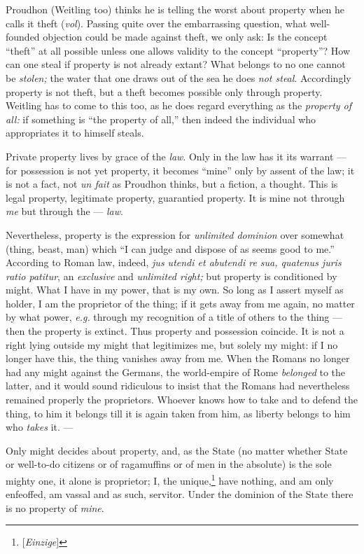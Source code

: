 \myhrule


Proudhon (Weitling too) thinks he is telling the worst about property when he 
calls it theft (\textit{vol}). Passing quite over the embarrassing question, 
what well-founded objection could be made against theft, we only ask: Is the 
concept ``theft'' at all possible unless one allows validity to the concept 
``property''? How can one steal if property is not already extant? What 
belongs to no one cannot be \textit{stolen;} the water that one draws out of 
the sea he does \textit{not steal}. Accordingly property is not theft, but a 
theft becomes possible only through property. Weitling has to come to this 
too, as he does regard everything as the \textit{property of all:} if 
something is ``the property of all,'' then indeed the individual who 
appropriates it to himself steals.

Private property lives by grace of the \textit{law}. Only in the law has it 
its warrant --- for possession is not yet property, it becomes ``mine'' only 
by assent of the law; it is not a fact, not \textit{un fait} as Proudhon 
thinks, but a fiction, a thought. This is legal property, legitimate property, 
guarantied property. It is mine not through \textit{me} but through the --- \textit{law}.

Nevertheless, property is the expression for \textit{unlimited dominion} over 
somewhat (thing, beast, man) which ``I can judge and dispose of as seems good 
to me.'' According to Roman law, indeed, \textit{jus utendi et abutendi re 
sua, quatenus juris ratio patitur}, an \textit{exclusive} and 
\textit{unlimited right;} but property is conditioned by might. What I have in 
my power, that is my own. So long as I assert myself as holder, I am the 
proprietor of the thing; if it gets away from me again, no matter by what 
power, \textit{e.g.} through my recognition of a title of others to the thing --- then the property is extinct. Thus property and possession coincide. It is 
not a right lying outside my might that legitimizes me, but solely my might: 
if I no longer have this, the thing vanishes away from me. When the Romans no 
longer had any might against the Germans, the world-empire of Rome 
\textit{belonged} to the latter, and it would sound ridiculous to insist that 
the Romans had nevertheless remained properly the proprietors. Whoever knows 
how to take and to defend the thing, to him it belongs till it is again taken 
from him, as liberty belongs to him who \textit{takes} it. ---

Only might decides about property, and, as the State (no matter whether State 
or well-to-do citizens or of ragamuffins or of men in the absolute) is the 
sole mighty one, it alone is proprietor; I, the 
unique,\footnote{[\textit{Einzige}]} have nothing, and am only enfeoffed, am 
vassal and as such, servitor. Under the dominion of the State there is no 
property of \textit{mine}.

